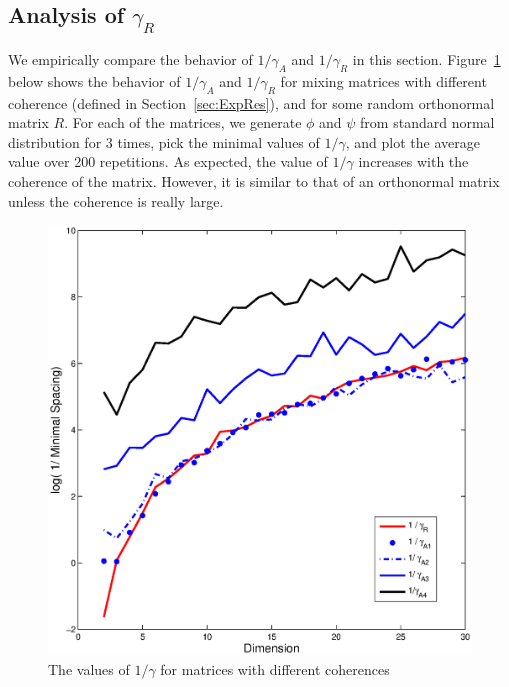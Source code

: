 \documentclass[jmlr]{article}
\theoremstyle{definition}
\newtheorem{remark}[lemma]{Remark}
\begin{document}
\subsection{Analysis of $\gamma_R$}
\label{sec:gamma}
We empirically compare the behavior of $1/\gamma_A$ and $1/\gamma_R$ in this section.
Figure~\ref{fig:miniSpacing} below shows the behavior of $1/\gamma_A$ and $1/\gamma_R$ for mixing matrices with different coherence (defined in Section~\ref{sec:ExpRes}), and for some random orthonormal matrix $R$. For each of the matrices, we generate $\phi$ and $\psi$ from standard normal distribution for 3 times, pick the minimal values of $1/\gamma$, and plot the average value over 200 repetitions. %
As expected, the value of $1/\gamma$ increases with the coherence of the matrix. However, it is similar to that of an orthonormal matrix unless the coherence is really large. 
\begin{figure}[h]
\centering
	\includegraphics[width = 0.75\columnwidth]{miniSpacing}
\vspace{-0.4cm}
\caption{
\label{fig:miniSpacing}
 The values of $1/\gamma$ for matrices with different coherences}
\vspace{-0.5cm}
\end{figure}

\end{document}
